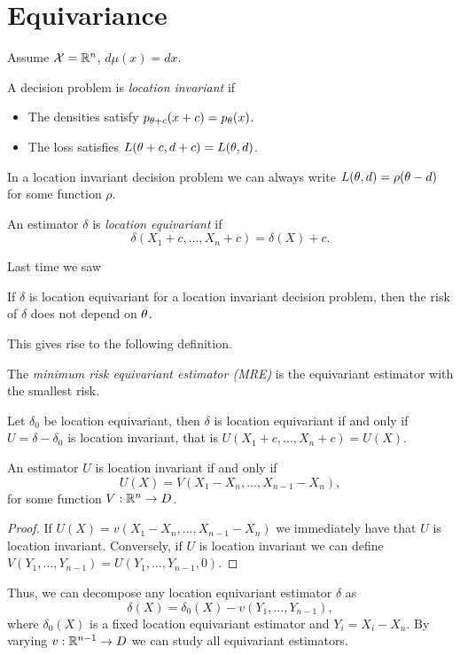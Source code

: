 \section{Equivariance}
Assume ${\mathcal{X}} = {\mathbb R}^n$, $d\mu(x) = dx$.
\begin{defn}
    A decision problem is \emph{location invariant} if 
    \begin{itemize}
        \item The densities satisfy $p_{{\theta}+c}(x+c)=p_{\theta}(x)$.
        \item The loss satisfies $L({\theta}+c,d+c) = L({\theta},d)$.
    \end{itemize}
\end{defn}
In a location invariant decision problem we can always write $L({\theta},d) = \rho({\theta} -d)$ for some function $\rho$.
\begin{defn}
    An estimator $\delta$ is \emph{location equivariant} if 
    \[\delta(X_1+c,\ldots, X_n + c) = \delta(X)+c. \]
\end{defn}
Last time we saw
\begin{thrm}
    If $\delta$ is location equivariant for a location invariant decision problem, then the risk of $\delta$ does not depend on ${\theta}$.
\end{thrm}
This gives rise to the following definition.
\begin{defn}
    The \emph{minimum risk equivariant estimator (MRE)} is the equivariant estimator with the smallest risk.
\end{defn}
\begin{lemma}
    Let $\delta_0$ be location equivariant, then $\delta$ is location equivariant if and only if $U=\delta-\delta_0$ is location invariant, that is $U(X_1+c,\ldots, X_n+c)=U(X)$.
\end{lemma}
\begin{lemma}
    An estimator $U$ is location invariant if and only if
    \[U(X)=V(X_1-X_n,\ldots, X_{n-1}-X_n), \]
    for some function $V : {\mathbb R}^n \to D$.
\end{lemma}
\begin{proof}
    If $U(X) = v(X_1-X_n,\ldots, X_{n-1}-X_n)$ we immediately have that $U$ is location invariant. Conversely, if $U$ is location invariant we can define $V(Y_1,\ldots, Y_{n-1})=U(Y_1,\ldots, Y_{n-1},0)$. 
\end{proof}
Thus, we can decompose any location equivariant estimator $\delta$ as 
\[\delta(X) = \delta_0(X)-v(Y_1,\ldots, Y_{n-1}),  \]
where $\delta_0(X)$ is a fixed location equivariant estimator and $Y_i = X_i-X_n$. By varying $v : {\mathbb R}^{n-1} \to D$ we can study all equivariant estimators.
